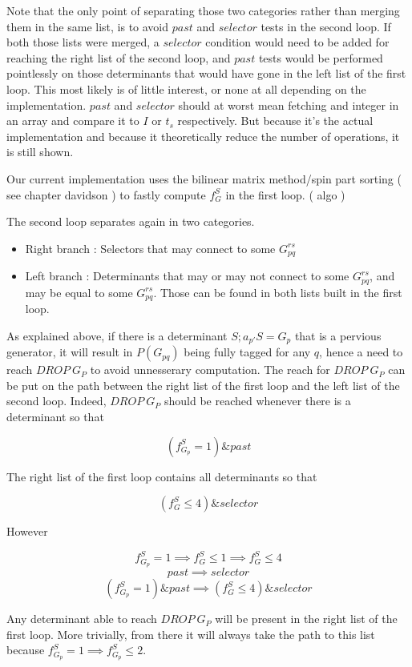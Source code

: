 Note that the only point of separating those two categories rather than merging them in the same list, is to avoid $past$ and $selector$ tests in the second loop. If both those lists were merged, a $selector$ condition would need to be added for reaching the right list of the second loop, and $past$ tests would be performed pointlessly on those determinants that would have gone in the left list of the first loop.
This most likely is of little interest, or none at all depending on the implementation. $past$ and $selector$ should at worst mean fetching and integer in an array and compare it to $I$ or $t_s$ respectively. But because it's the actual implementation and because it theoretically reduce the number of operations, it is still shown.

Our current implementation uses the bilinear matrix method/spin part sorting ( see chapter davidson ) to fastly compute $f_G^S$ in the first loop. ( algo )


The second loop separates again in two categories.

\begin{itemize}
\item
Right branch : Selectors that may connect to some $G_{pq}^{rs}$
\item
Left branch : Determinants that may or may not connect to some $G_{pq}^{rs}$, and may be equal to some $G_{pq}^{rs}$. Those can be found in both lists built in the first loop.
\end{itemize}

As explained above, if there is a determinant $S ; a_{p'}S = G_{p}$ that is a pervious generator, it will result in $P(G_{pq})$ being fully tagged for any $q$, hence a need to reach $DROP\ G_P$ to avoid unnesserary computation.
The reach for $DROP\ G_P$ can be put on the path between the right list of the first loop and the left list of the second loop.
Indeed, $DROP\ G_P$ should be reached whenever there is a determinant so that

$$(f^S_{G_{p}} = 1) \& past$$

The right list of the first loop contains all determinants so that

$$(f^S_G \leq 4) \& selector$$

However 

$$f^S_{G_{p}} = 1 \implies f^S_G \leq 1 \implies f^S_G \leq 4$$
$$past \implies selector$$
$$(f^S_{G_{p}} = 1) \& past \implies (f^S_G \leq 4) \& selector$$


Any determinant able to reach $DROP\ G_P$ will be present in the right list of the first loop. More trivially, from there it will always take the path to this list because $f^S_{G_{p}} = 1 \implies f^S_{G_{p}} \leq 2$.

